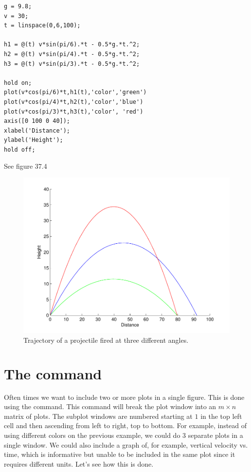 \begin{matlab}
\begin{lstlisting}[style=matlab]
g = 9.8;
v = 30;
t = linspace(0,6,100);

h1 = @(t) v*sin(pi/6).*t - 0.5*g.*t.^2;
h2 = @(t) v*sin(pi/4).*t - 0.5*g.*t.^2;
h3 = @(t) v*sin(pi/3).*t - 0.5*g.*t.^2;

hold on;
plot(v*cos(pi/6)*t,h1(t),'color','green')
plot(v*cos(pi/4)*t,h2(t),'color','blue')
plot(v*cos(pi/3)*t,h3(t),'color', 'red')
axis([0 100 0 40]);
xlabel('Distance');
ylabel('Height');
hold off;
\end{lstlisting}
\end{matlab}

See figure 37.4

\begin{figure}
\begin{center}
\begin{matlab}
\includegraphics[scale=0.5]{./FiguresMAT/plot4}
\end{matlab}
\caption{Trajectory of a projectile fired at three different angles.}
\end{center}
\end{figure}

\begin{problem} 
\end{problem}

\section{The  command}  Often times we want to include two or more plots in a single figure.  This is done using the  command.  This command will break the plot window into an $m\times n$ matrix of plots.  The subplot windows are numbered starting at $1$ in the top left cell and then ascending from left to right, top to bottom.  For example, instead of using different colors on the previous example, we could do 3 separate plots in a single window.  We could also include a graph of, for example, vertical velocity vs. time, which is informative but unable to be included in the same plot since it requires different units.  Let's see how this is done.


